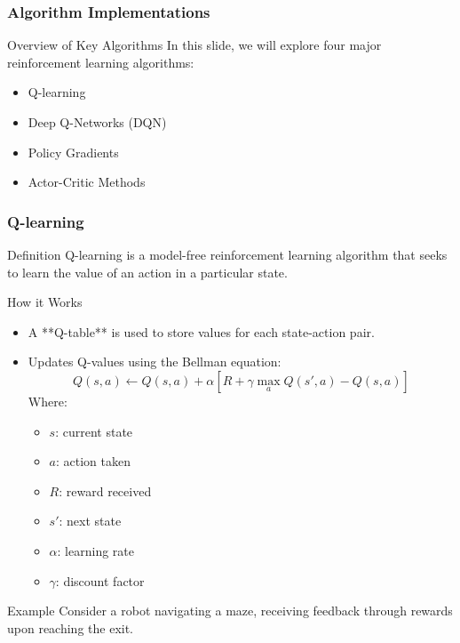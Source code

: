 \documentclass{beamer}
\begin{document}
\begin{frame}[fragile]
    \frametitle{Algorithm Implementations}
    \begin{block}{Overview of Key Algorithms}
        In this slide, we will explore four major reinforcement learning algorithms:
        \begin{itemize}
            \item Q-learning
            \item Deep Q-Networks (DQN)
            \item Policy Gradients
            \item Actor-Critic Methods
        \end{itemize}
    \end{block}
\end{frame}

\begin{frame}[fragile]
    \frametitle{Q-learning}
    \begin{block}{Definition}
        Q-learning is a model-free reinforcement learning algorithm that seeks to learn the value of an action in a particular state.
    \end{block}

    \begin{block}{How it Works}
        \begin{itemize}
            \item A **Q-table** is used to store values for each state-action pair.
            \item Updates Q-values using the Bellman equation:
            \begin{equation}
                Q(s, a) \gets Q(s, a) + \alpha [R + \gamma \max_a Q(s', a) - Q(s, a)]
            \end{equation}
            Where:
            \begin{itemize}
                \item \( s \): current state
                \item \( a \): action taken
                \item \( R \): reward received
                \item \( s' \): next state
                \item \( \alpha \): learning rate
                \item \( \gamma \): discount factor
            \end{itemize}
        \end{itemize}
    \end{block}

    \begin{block}{Example}
        Consider a robot navigating a maze, receiving feedback through rewards upon reaching the exit.
    \end{block}
\end{frame}
\end{document}
